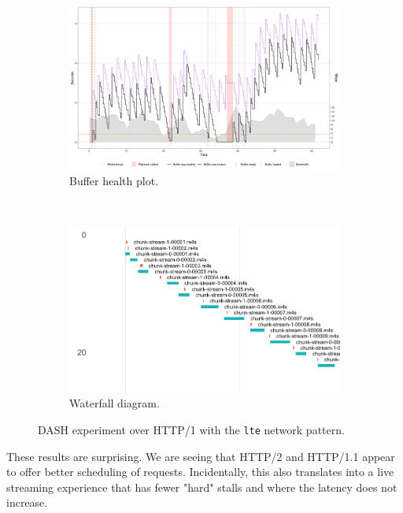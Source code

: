 \begin{figure}[h]
	\centering
	
	\begin{subfigure}[t]{0.5\textwidth}
		\centering
		\includegraphics[width=\textwidth]{res/eval_nonabr_lte_h1.png}
		\caption{Buffer health plot.}
		\label{fig:eval_nonabr_lte_h1_buffer}
	\end{subfigure}%
	~ 
	\begin{subfigure}[t]{0.5\textwidth}
		\centering
		\includegraphics[width=\textwidth]{res/eval_nonabr_lte_h1_waterfall.png}
		\caption{Waterfall diagram.}
		\label{fig:eval_nonabr_lte_h1_waterfall}
	\end{subfigure}
	
	\caption{DASH experiment over HTTP/1 with the \texttt{lte} network pattern.}
	\label{fig:eval_nonabr_lte_h1}
\end{figure}

These results are surprising. We are seeing that HTTP/2 and HTTP/1.1 appear to offer better scheduling of requests. Incidentally, this also translates into a live streaming experience that has fewer "hard" stalls and where the latency does not increase.

